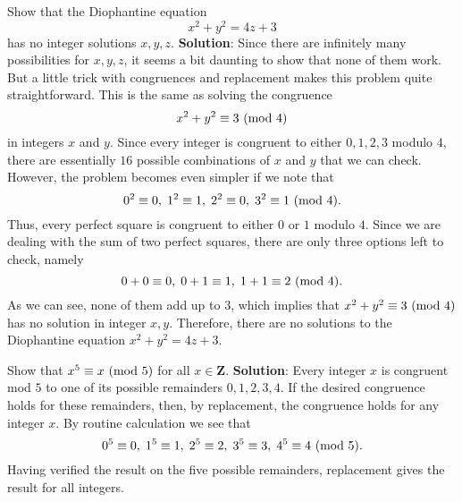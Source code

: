 \begin{Example}{}{}
    Show that the Diophantine equation
    \[ x^2+y^2=4z+3 \]
    has no integer solutions $ x,y,z $.
    \tcblower{}
    \textbf{Solution}: Since there are infinitely many possibilities for $ x,y,z $, it seems a
    bit daunting to show that none of them work. But a little trick with congruences
    and replacement makes this problem quite straightforward. This is the same as
    solving the congruence
    \[ x^2+y^2\equiv 3\ (\mathrm{mod}\ 4) \]
    in integers $ x $ and $ y $. Since every integer is congruent to either $ 0,1,2,3 $ modulo $ 4 $,
    there are essentially $ 16 $ possible combinations of $ x $ and $ y $ that we can check. However,
    the problem becomes even simpler if we note that
    \[ 0^2\equiv 0,\; 1^2\equiv 1,\; 2^2\equiv 0,\; 3^2\equiv 1\ (\mathrm{mod}\ 4). \]
    Thus, every perfect square is congruent to either $ 0 $ or $ 1 $ modulo $ 4 $. Since we
    are dealing with the sum of two perfect squares, there are only three options left to check, namely
    \[ 0+0\equiv 0,\; 0+1\equiv 1,\; 1+1\equiv 2\ (\mathrm{mod}\ 4). \]
    As we can see, none of them add up to $ 3 $, which implies that $ x^2+y^2\equiv 3\ (\mathrm{mod}\ 4) $
    has no solution in integer $ x,y $. Therefore, there are no solutions to the Diophantine equation
    $ x^2+y^2=4z+3 $.
\end{Example}
\begin{Example}{}{}
    Show that $ x^5\equiv x\ (\mathrm{mod}\ 5) $ for all $ x\in\mathbf{Z} $.
    \tcblower{}
    \textbf{Solution}: Every integer $ x $ is congruent mod $ 5 $ to one of its possible remainders
    $ 0,1,2,3,4 $. If the desired congruence holds for these remainders, then, by replacement,
    the congruence holds for any integer $x$. By routine calculation we see that
    \[ 0^5\equiv 0,\; 1^5\equiv 1,\; 2^5\equiv 2,\; 3^5\equiv 3,\; 4^5\equiv 4\ (\mathrm{mod}\ 5). \]
    Having verified the result on the five possible remainders, replacement gives the
    result for all integers.
\end{Example}
